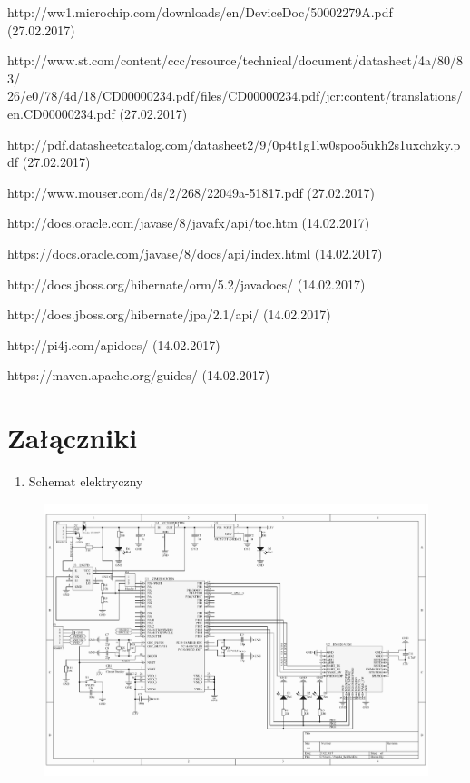 \documentclass[12pt, twoside]{article} %
\numberwithin{equation}{subsection}
\numberwithin{figure}{section}
\numberwithin{table}{section}
\begin{document}
\begin{thebibliography}{99}
		http://ww1.microchip.com/downloads/en/DeviceDoc/50002279A.pdf (27.02.2017)
		
		http://www.st.com/content/ccc/resource/technical/document/datasheet/4a/80/83/
		26/e0/78/4d/18/CD00000234.pdf/files/CD00000234.pdf/jcr:content/translations/
		en.CD00000234.pdf (27.02.2017)
		
		http://pdf.datasheetcatalog.com/datasheet2/9/0p4t1g1lw0spoo5ukh2s1uxchzky.pdf (27.02.2017)
		
		http://www.mouser.com/ds/2/268/22049a-51817.pdf (27.02.2017)
		
		http://docs.oracle.com/javase/8/javafx/api/toc.htm (14.02.2017)
		
		https://docs.oracle.com/javase/8/docs/api/index.html (14.02.2017)
		
		http://docs.jboss.org/hibernate/orm/5.2/javadocs/ (14.02.2017)
		
		http://docs.jboss.org/hibernate/jpa/2.1/api/ (14.02.2017)
		
		http://pi4j.com/apidocs/ (14.02.2017)
		
		https://maven.apache.org/guides/ (14.02.2017)
		

\end{thebibliography}
	\newpage

	\listoffigures{}
	\newpage

	\listoftables
	\newpage
	
	\section*{Załączniki}

	\begin{enumerate}
		\item{Schemat elektryczny}
	\end{enumerate}
	
	\newpage
	
	\thispagestyle{empty}
	\begin{figure}[ht]
		\centering
		\includegraphics[scale=0.8, angle=90]{Images/SchematUkladuElektrycznego.pdf}
	\end{figure}
	\thispagestyle{empty}
\end{document}
